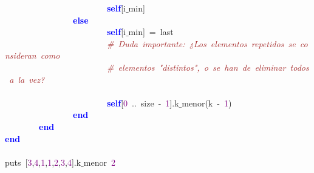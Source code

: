 \mbox{}\ \ \ \ \ \ \ \ \ \ \ \ \ \ \ \ \ \ \ \ \ \ \ \ \textbf{\textcolor{Blue}{self}}\textcolor{BrickRed}{[}i$\_$min\textcolor{BrickRed}{]} \\
\mbox{}\ \ \ \ \ \ \ \ \ \ \ \ \ \ \ \ \textbf{\textcolor{Blue}{else}} \\
\mbox{}\ \ \ \ \ \ \ \ \ \ \ \ \ \ \ \ \ \ \ \ \ \ \ \ \textbf{\textcolor{Blue}{self}}\textcolor{BrickRed}{[}i$\_$min\textcolor{BrickRed}{]}\ \textcolor{BrickRed}{=}\ last \\
\mbox{}\ \ \ \ \ \ \ \ \ \ \ \ \ \ \ \ \ \ \ \ \ \ \ \ \textit{\textcolor{Brown}{\#\ Duda\ importante:\ ¿Los\ elementos\ repetidos\ se\ consideran\ como}} \\
\mbox{}\ \ \ \ \ \ \ \ \ \ \ \ \ \ \ \ \ \ \ \ \ \ \ \ \textit{\textcolor{Brown}{\#\ elementos\ "{}distintos"{},\ o\ se\ han\ de\ eliminar\ todos\ a\ la\ vez?}} \\
\mbox{} \\
\mbox{}\ \ \ \ \ \ \ \ \ \ \ \ \ \ \ \ \ \ \ \ \ \ \ \ \textbf{\textcolor{Blue}{self}}\textcolor{BrickRed}{[}\textcolor{Purple}{0}\ \textcolor{BrickRed}{..}\ size\ \textcolor{BrickRed}{-}\ \textcolor{Purple}{1}\textcolor{BrickRed}{].}k$\_$menor\textcolor{BrickRed}{(}k\ \textcolor{BrickRed}{-}\ \textcolor{Purple}{1}\textcolor{BrickRed}{)} \\
\mbox{}\ \ \ \ \ \ \ \ \ \ \ \ \ \ \ \ \textbf{\textcolor{Blue}{end}} \\
\mbox{}\ \ \ \ \ \ \ \ \textbf{\textcolor{Blue}{end}} \\
\mbox{}\textbf{\textcolor{Blue}{end}} \\
\mbox{} \\
\mbox{}puts\ \textcolor{BrickRed}{[}\textcolor{Purple}{3}\textcolor{BrickRed}{,}\textcolor{Purple}{4}\textcolor{BrickRed}{,}\textcolor{Purple}{1}\textcolor{BrickRed}{,}\textcolor{Purple}{1}\textcolor{BrickRed}{,}\textcolor{Purple}{2}\textcolor{BrickRed}{,}\textcolor{Purple}{3}\textcolor{BrickRed}{,}\textcolor{Purple}{4}\textcolor{BrickRed}{].}k$\_$menor\ \textcolor{Purple}{2}
